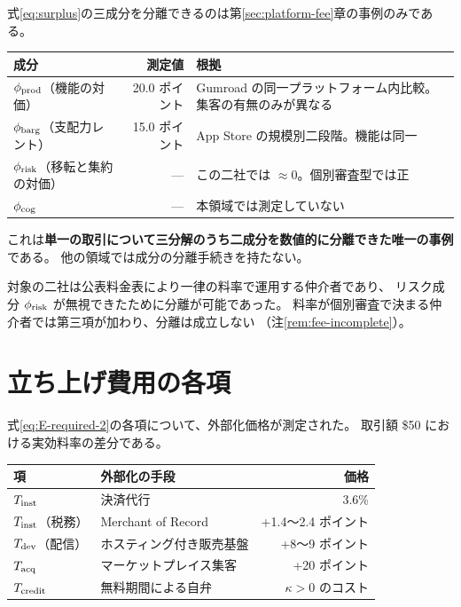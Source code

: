 式\eqref{eq:surplus}の三成分を分離できるのは第\ref{sec:platform-fee}章の事例のみである。

\begin{center}
\begin{tabularx}{\textwidth}{@{}lrX@{}}
\toprule
成分 & 測定値 & 根拠 \\
\midrule
$\phi_{\rm prod}$（機能の対価） & 20.0 ポイント & Gumroad の同一プラットフォーム内比較。集客の有無のみが異なる \\
$\phi_{\rm barg}$（支配力レント） & 15.0 ポイント & App Store の規模別二段階。機能は同一 \\
$\phi_{\rm risk}$（移転と集約の対価） & --- & この二社では $\approx 0$。個別審査型では正 \\
$\phi_{\rm cog}$ & --- & 本領域では測定していない \\
\bottomrule
\end{tabularx}
\label{tab:surplus-decomposition-measured}
\end{center}

これは\textbf{単一の取引について三分解のうち二成分を数値的に分離できた唯一の事例}である。
他の領域では成分の分離手続きを持たない。

対象の二社は公表料金表により一律の料率で運用する仲介者であり、
リスク成分 $\phi_{\rm risk}$ が無視できたために分離が可能であった。
料率が個別審査で決まる仲介者では第三項が加わり、分離は成立しない
（注\ref{rem:fee-incomplete}）。

\section{立ち上げ費用の各項}

式\eqref{eq:E-required-2}の各項について、外部化価格が測定された。
取引額 \$50 における実効料率の差分である。

\begin{center}
\begin{tabular}{@{}llr@{}}
\toprule
項 & 外部化の手段 & 価格 \\
\midrule
$T_{\rm inst}$ & 決済代行 & 3.6\% \\
$T_{\rm inst}$（税務） & Merchant of Record & +1.4〜2.4 ポイント \\
$T_{\rm dev}$（配信） & ホスティング付き販売基盤 & +8〜9 ポイント \\
$T_{\rm acq}$ & マーケットプレイス集客 & +20 ポイント \\
$T_{\rm credit}$ & 無料期間による自弁 & $\kappa>0$ のコスト \\
\bottomrule
\end{tabular}
\label{tab:launch-cost-externalization}
\end{center}

